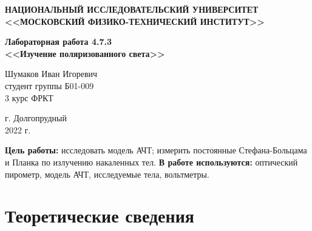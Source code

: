 \documentclass[a4paper,12pt]{article} %
\begin{document}
	
	
	\begin{center}
		
		\textbf{НАЦИОНАЛЬНЫЙ ИССЛЕДОВАТЕЛЬСКИЙ УНИВЕРСИТЕТ \\ <<МОСКОВСКИЙ ФИЗИКО-ТЕХНИЧЕСКИЙ ИНСТИТУТ>>}
		\vspace{13ex}
		
		\textbf{Лабораторная работа 4.7.3\\ <<Изучение поляризованного света>>}
		\vspace{40ex}
		
		\normalsize{Шумаков Иван Игоревич \\ студент группы Б01-009\\ 3 курс ФРКТ\\}
	\end{center}
	
	\vfill 
	
	\begin{center}
		г. Долгопрудный\\ 
		2022 г.
	\end{center}
	
	
	\thispagestyle{empty} %
	\newpage
	
	
	\textbf{Цель работы:} исследовать модель АЧТ; измерить постоянные Стефана-Больцама и Планка по излучению накаленных тел.
	\textbf{В работе используются:} оптический пирометр, модель АЧТ, исследуемые тела, вольтметры.


	\section{Теоретические сведения}
\end{document}
